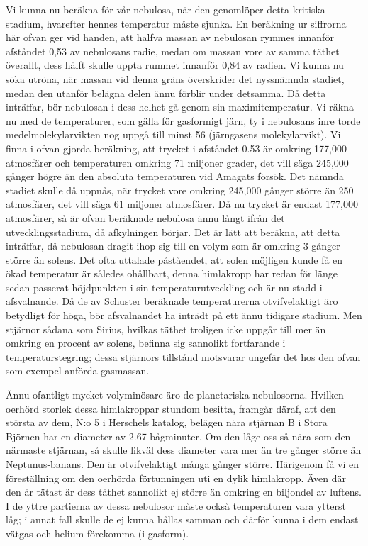 \documentclass[a4paper, 12pt, oneside, swedish]{article}
\begin{document}
Vi kunna nu beräkna för vår nebulosa, när den genomlöper detta kritiska stadium, hvarefter hennes temperatur måste sjunka. En beräkning ur siffrorna här ofvan ger vid handen, att halfva massan av nebulosan rymmes innanför afståndet 0,53 av nebulosans radie, medan om massan vore av samma täthet överallt, dess hälft skulle uppta rummet innanför 0,84 av radien. Vi kunna nu söka utröna, när massan vid denna gräns överskrider det nyssnämnda stadiet, medan den utanför belägna delen ännu förblir under detsamma. Då detta inträffar, bör nebulosan i dess helhet gå genom sin maximitemperatur. Vi räkna nu med de temperaturer, som gälla för gasformigt järn, ty i nebulosans inre torde medelmolekylarvikten nog uppgå till minst 56 (järngasens molekylarvikt). Vi finna i ofvan gjorda beräkning, att trycket i afståndet 0.53 är omkring 177,000 atmosfärer och temperaturen omkring 71 miljoner grader, det vill säga 245,000 gånger högre än den absoluta temperaturen vid Amagats försök. Det nämnda stadiet skulle då uppnås, när trycket vore omkring 245,000 gånger större än 250 atmosfärer, det vill säga 61 miljoner atmosfärer. Då nu trycket är endast 177,000 atmosfärer, så är ofvan beräknade nebulosa ännu långt ifrån det utvecklingsstadium, då afkylningen börjar. Det är lätt att beräkna, att detta inträffar, då nebulosan dragit ihop sig till en volym som är omkring 3 gånger större än solens. Det ofta uttalade påståendet, att solen möjligen kunde få en ökad temperatur är således ohållbart, denna himlakropp har redan för länge sedan passerat höjdpunkten i sin temperaturutveckling och är nu stadd i afsvalnande. Då de av Schuster beräknade temperaturerna otvifvelaktigt äro betydligt för höga, bör afsvalnandet ha inträdt på ett ännu tidigare stadium. Men stjärnor sådana som Sirius, hvilkas täthet troligen icke uppgår till mer än omkring en procent av solens, befinna sig sannolikt fortfarande i temperaturstegring; dessa stjärnors tillstånd motsvarar ungefär det hos den ofvan som exempel anförda gasmassan.

Ännu ofantligt mycket volyminösare äro de planetariska nebulosorna. Hvilken oerhörd storlek dessa himlakroppar stundom besitta, framgår däraf, att den största av dem, N:o 5 i Herschels katalog, belägen nära stjärnan B i Stora Björnen har en diameter av 2.67 bågminuter. Om den låge oss så nära som den närmaste stjärnan, så skulle likväl dess diameter vara mer än tre gånger större än Neptunus-banans. Den är otvifvelaktigt många gånger större. Härigenom få vi en föreställning om den oerhörda förtunningen uti en dylik himlakropp. Även där den är tätast är dess täthet sannolikt ej större än omkring en biljondel av luftens. I de yttre partierna av dessa nebulosor måste också temperaturen vara ytterst låg; i annat fall skulle de ej kunna hållas samman och därför kunna i dem endast vätgas och helium förekomma (i gasform).
\end{document}
